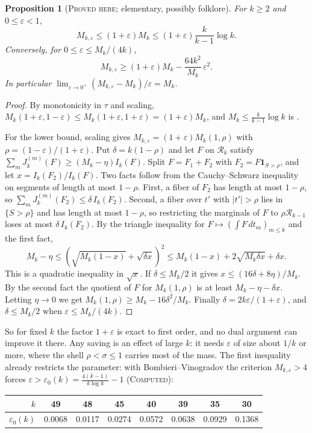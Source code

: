 \documentclass[11pt]{amsart}
\newtheorem{proposition}[theorem]{Proposition}
\theoremstyle{definition}
\theoremstyle{remark}
\newcommand{\lbl}[1]{\textup{\textsc{#1}}}
\newcommand{\R}{\mathcal{R}}
\begin{document}
\begin{proposition}[\lbl{Proved here}; elementary, possibly folklore]\label{prop:eps-first}
For $k\ge2$ and $0\le\varepsilon<1$,
\[
M_{k,\varepsilon}\le(1+\varepsilon)M_k\le(1+\varepsilon)\frac{k}{k-1}\log k .
\]
Conversely, for $0\le\varepsilon\le M_k/(4k)$,
\[
M_{k,\varepsilon}\ge(1+\varepsilon)M_k-\frac{64k^2}{M_k}\,\varepsilon^2 .
\]
In particular $\lim_{\varepsilon\to0^+}(M_{k,\varepsilon}-M_k)/\varepsilon=M_k$.
\end{proposition}

\begin{proof}
By monotonicity in $\tau$ and scaling,
$M_k(1+\varepsilon,1-\varepsilon)\le M_k(1+\varepsilon,1+\varepsilon)=(1+\varepsilon)M_k$,
and $M_k\le\frac{k}{k-1}\log k$ is \cite[Cor.~6.4]{Pol14b}.

For the lower bound, scaling gives $M_{k,\varepsilon}=(1+\varepsilon)M_k(1,\rho)$
with $\rho=(1-\varepsilon)/(1+\varepsilon)$. Put $\delta=k(1-\rho)$ and let $F$
on $\R_k$ satisfy $\sum_mJ_k^{(m)}(F)\ge(M_k-\eta)I_k(F)$. Split $F=F_1+F_2$
with $F_2=F\mathbf 1_{S>\rho}$, and let $x=I_k(F_2)/I_k(F)$. Two facts follow
from the Cauchy--Schwarz inequality on segments of length at most $1-\rho$.
First, a fiber of $F_2$ has length at most $1-\rho$, so
$\sum_mJ_k^{(m)}(F_2)\le\delta\,I_k(F_2)$. Second, a fiber over $t'$ with
$|t'|>\rho$ lies in $\{S>\rho\}$ and has length at most $1-\rho$, so
restricting the marginals of $F$ to $\rho\R_{k-1}$ loses at most
$\delta\,I_k(F_2)$. By the triangle inequality for
$F\mapsto(\int F\,dt_m)_{m\le k}$ and the first fact,
\[
M_k-\eta\le\left(\sqrt{M_k(1-x)}+\sqrt{\delta x}\right)^2\le M_k(1-x)+2\sqrt{M_k\delta x}+\delta x .
\]
This is a quadratic inequality in $\sqrt x$. If $\delta\le M_k/2$ it gives
$x\le(16\delta+8\eta)/M_k$. By the second fact the quotient of $F$ for
$M_k(1,\rho)$ is at least $M_k-\eta-\delta x$. Letting $\eta\to0$ we get
$M_k(1,\rho)\ge M_k-16\delta^2/M_k$. Finally
$\delta=2k\varepsilon/(1+\varepsilon)$, and $\delta\le M_k/2$ when
$\varepsilon\le M_k/(4k)$.
\end{proof}

So for fixed $k$ the factor $1+\varepsilon$ is exact to first order, and no
dual argument can improve it there. Any saving is an effect of large $k$: it
needs $\varepsilon$ of size about $1/k$ or more, where the shell
$\rho<\sigma\le1$ carries most of the mass. The first inequality already
restricts the parameter: with Bombieri--Vinogradov the criterion
$M_{k,\varepsilon}>4$ forces
$\varepsilon>\varepsilon_0(k)=\frac{4(k-1)}{k\log k}-1$ (\lbl{Computed}):
\begin{center}
\begin{tabular}{@{}rccccccc@{}}
\toprule
$k$ & 49 & 48 & 45 & 40 & 39 & 35 & 30\\
\midrule
$\varepsilon_0(k)$ & 0.0068 & 0.0117 & 0.0274 & 0.0572 & 0.0638 & 0.0929 & 0.1368\\
\bottomrule
\end{tabular}
\end{center}
\end{document}
